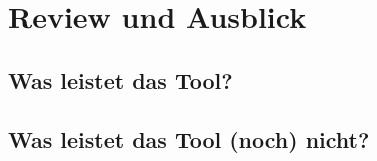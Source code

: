 \chapter{Review und Ausblick}\label{review}
\section{Was leistet das Tool?}


\section{Was leistet das Tool (noch) nicht?}






